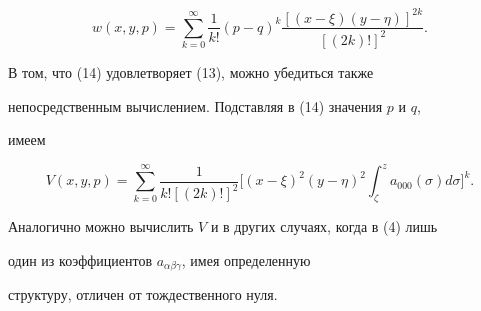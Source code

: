 \begin{equation} 


w(x,y,p)=\sum^\infty_{k=0}\frac{1}{k!}(p-q)^k 


\frac{[(x-\xi)(y-\eta)]^{2k}}{[(2k)!]^2}. 


\end{equation} 


В том, что (14) удовлетворяет (13), можно убедиться также 


непосредственным вычислением. Подставляя в (14) значения $p$ и $q$, 


имеем 


$$ 


V(x,y,p)=\sum^\infty_{k=0}\frac{1}{k![(2k)!]^2}\bigg[ 


(x-\xi)^2(y-\eta)^2\int^z_\zeta a_{000}(\sigma)d\sigma\bigg]^k. 


$$ 


 


Аналогично можно вычислить $V$ и в других случаях, когда в (4) лишь 


один из коэффициентов $a_{\alpha\beta\gamma}$, имея определенную 


структуру, отличен от тождественного нуля. 


 


 


